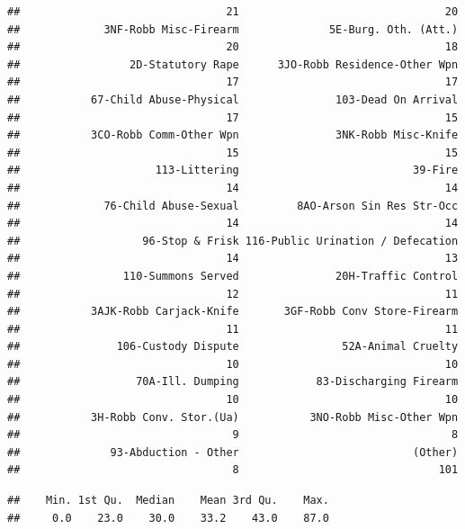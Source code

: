 \documentclass[12pt,]{book}
\newenvironment{Shaded}{\begin{snugshade}}{\end{snugshade}}
\newcommand{\KeywordTok}[1]{\textcolor[rgb]{0.13,0.29,0.53}{\textbf{#1}}}
\newcommand{\CommentTok}[1]{\textcolor[rgb]{0.56,0.35,0.01}{\textit{#1}}}
\newcommand{\OperatorTok}[1]{\textcolor[rgb]{0.81,0.36,0.00}{\textbf{#1}}}
\newcommand{\NormalTok}[1]{#1}
\theoremstyle{definition}
\theoremstyle{definition}
\theoremstyle{definition}
\theoremstyle{remark}
\begin{document}
\begin{verbatim}
##                                21                                20 
##             3NF-Robb Misc-Firearm              5E-Burg. Oth. (Att.) 
##                                20                                18 
##                 2D-Statutory Rape      3JO-Robb Residence-Other Wpn 
##                                17                                17 
##           67-Child Abuse-Physical               103-Dead On Arrival 
##                                17                                15 
##           3CO-Robb Comm-Other Wpn               3NK-Robb Misc-Knife 
##                                15                                15 
##                     113-Littering                           39-Fire 
##                                14                                14 
##             76-Child Abuse-Sexual         8AO-Arson Sin Res Str-Occ 
##                                14                                14 
##                   96-Stop & Frisk 116-Public Urination / Defecation 
##                                14                                13 
##                110-Summons Served               20H-Traffic Control 
##                                12                                11 
##           3AJK-Robb Carjack-Knife       3GF-Robb Conv Store-Firearm 
##                                11                                11 
##               106-Custody Dispute                52A-Animal Cruelty 
##                                10                                10 
##                  70A-Ill. Dumping            83-Discharging Firearm 
##                                10                                10 
##           3H-Robb Conv. Stor.(Ua)           3NO-Robb Misc-Other Wpn 
##                                 9                                 8 
##              93-Abduction - Other                           (Other) 
##                                 8                               101
\end{verbatim}

\begin{Shaded}
\end{Shaded}

\begin{verbatim}
##    Min. 1st Qu.  Median    Mean 3rd Qu.    Max. 
##     0.0    23.0    30.0    33.2    43.0    87.0
\end{verbatim}
\end{document}
